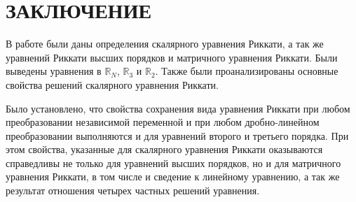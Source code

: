 \chapter*{ \large ЗАКЛЮЧЕНИЕ}
В работе были даны определения скалярного уравнения Риккати, а так же уравнений Риккати высших порядков и матричного уравнения Риккати. Были выведены уравнения в $\mathbb{R}_N$, $\mathbb{R}_3$ и $\mathbb{R}_2$. Также были проанализированы основные свойства решений скалярного уравнения Риккати.

Было установлено, что свойства сохранения вида уравнения Риккати при любом преобразовании независимой переменной и при любом дробно-линейном преобразовании выполняются и для уравнений второго и третьего порядка. При этом свойства, указанные для скалярного уравнения Риккати оказываются справедливы не только для уравнений высших порядков, но и для матричного уравнения Риккати, в том числе и сведение к линейному уравнению, а так же результат отношения четырех частных решений уравнения.
